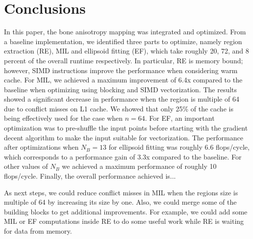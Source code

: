 \documentclass[letterpaper]{article}
\begin{document}
\section{Conclusions}
In this paper, the bone anisotropy mapping was integrated and optimized. From a baseline implementation, we identified three parts to optimize, namely region extraction (RE), MIL and ellipsoid fitting (EF), which take roughly 20, 72, and 8 percent of the overall runtime respectively. In particular, RE is memory bound; however, SIMD instructions improve the performance when considering warm cache. For MIL, we achieved a maximum improvement of 6.4x compared to the baseline when optimizing using blocking and SIMD vectorization. The results showed a significant decrease in performance when the region is multiple of 64 due to conflict misses on L1 cache. We showed that only 25\% of the cache is being effectively used for the case when $n = 64$. For EF, an important optimization was to pre-shuffle the input points before starting with the gradient decent algorithm  to make the input suitable for vectorization. The performance after optimizations when $N_B = 13$ for ellipsoid fitting was roughly 6.6 flops/cycle, which corresponds to a performance gain of 3.3x compared to the baseline. For other values of $N_B$ we achieved a maximum performance of roughly 10 flops/cycle. Finally, the overall performance achieved {\color{red}is...}

As next steps, we could reduce conflict misses in MIL when the regions size is multiple of 64 by increasing its size by one. Also, we could merge some of the building blocks to get additional improvements. For example, we could add some MIL or EF computations inside RE to do some useful work while RE is waiting for data from memory.


%

%



\end{document}
